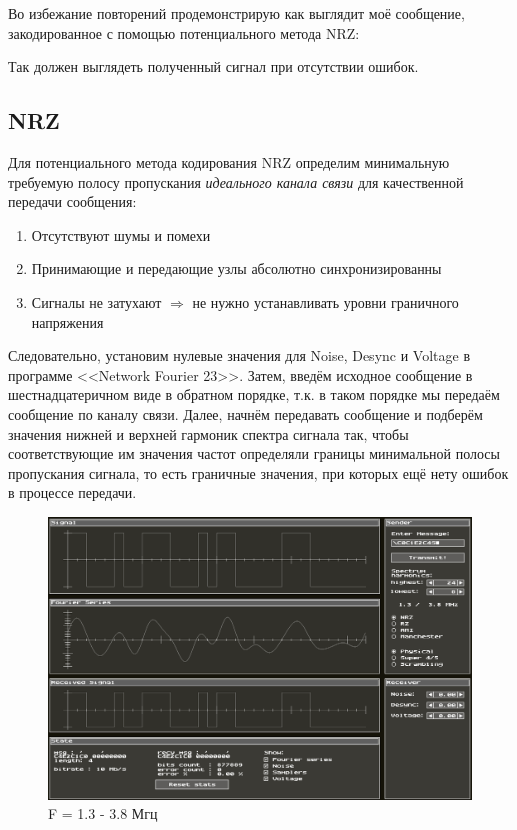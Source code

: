 Во избежание повторений продемонстрирую как выглядит моё сообщение, закодированное с помощью потенциального метода NRZ:


Так должен выглядеть полученный сигнал при отсутствии ошибок.

\subsection{NRZ}

Для потенциального метода кодирования NRZ определим минимальную требуемую полосу пропускания \textit{идеального канала связи} для качественной передачи сообщения:
\begin{enumerate}
	\item Отсутствуют шумы и помехи
	\item Принимающие и передающие узлы абсолютно синхронизированны
	\item Сигналы не затухают $\Rightarrow$ не нужно устанавливать уровни граничного напряжения
\end{enumerate}

Следовательно, установим нулевые значения для Noise, Desync и Voltage в программе <<Network Fourier 23>>. Затем, введём исходное сообщение в шестнадцатеричном виде в обратном порядке, т.к. в таком порядке мы передаём сообщение по каналу связи. Далее, начнём передавать сообщение и подберём значения нижней и верхней гармоник спектра сигнала так, чтобы соответствующие им значения частот определяли границы минимальной полосы пропускания сигнала, то есть граничные значения, при которых ещё нету ошибок в процессе передачи.


\begin{figure}
	\centering
	\includegraphics[width=0.95\linewidth]{./data/ideal_nrz_min_f.png}
	\caption{F = 1.3 - 3.8 Мгц}
\end{figure}

